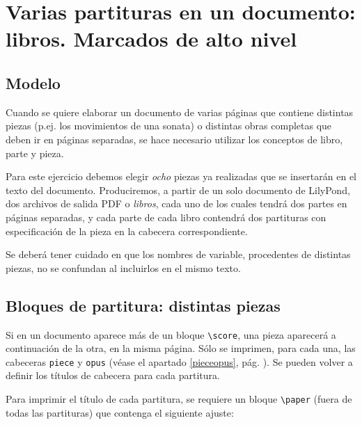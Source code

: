 \section{Varias partituras en un documento: libros.  Marcados de alto nivel}


\subsection{Modelo}

Cuando se quiere elaborar un documento de varias páginas que contiene
distintas piezas (p.ej. los movimientos de una sonata) o distintas
obras completas que deben ir en páginas separadas, se hace necesario
utilizar los conceptos de libro, parte y pieza.

Para este ejercicio debemos elegir \emph{ocho} piezas ya realizadas
que se insertarán en el texto del documento.  Produciremos, a partir
de un solo documento de LilyPond, dos archivos de salida PDF o
\emph{libros}, cada uno de los cuales tendrá dos partes en páginas
separadas, y cada parte de cada libro contendrá dos partituras con
especificación de la pieza en la cabecera correspondiente.

\bigskip
\parindent=0mm
\parindent=6mm
\bigskip

Se deberá tener cuidado en que los nombres de variable,
procedentes de distintas piezas, no se confundan al incluirlos en
el mismo texto.


\subsection{Bloques de partitura: distintas piezas}

Si en un documento aparece más de un bloque \verb+\score+, una pieza
aparecerá a continuación de la otra, en la misma página. Sólo se
imprimen, para cada una, las cabeceras \verb+piece+ y \verb+opus+
(véase el apartado \ref{pieceopus}, pág. \pageref{pieceopus}). Se
pueden volver a definir los títulos de cabecera para cada partitura.

Para imprimir el título de cada partitura, se requiere un bloque
\verb+\paper+ (fuera de todas las partituras) que contenga el
siguiente ajuste:

